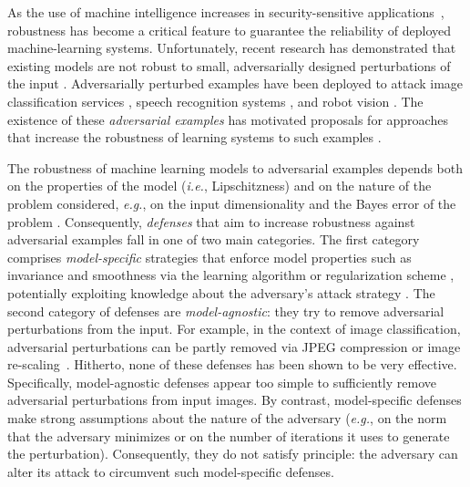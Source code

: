 As the use of machine intelligence increases in security-sensitive applications~\citep{bojarski2016end, amodei2015deep}, robustness has become a critical feature to guarantee the reliability of deployed machine-learning systems. Unfortunately, recent research has demonstrated that existing models are not robust to small, adversarially designed perturbations of the input \citep{biggio2013evasion, szegedy2013intriguing, goodfellow2015explaining, kurakin2016adversarial, cisse2017houdini}. Adversarially perturbed examples have been deployed to attack image classification services \citep{liu2016delving}, speech recognition systems \citep{cisse2017houdini}, and robot vision \citep{melis2017robot}. The existence of these \emph{adversarial examples} has motivated proposals for approaches that increase the robustness of learning systems to such examples \citep{papernot2016distillation, kurakin2016adversarial, cisse2017parseval}. 

The robustness of machine learning models to adversarial examples depends both on the properties of the model (\emph{i.e.}, Lipschitzness) and on the nature of the problem considered, \emph{e.g.}, on the input dimensionality and the Bayes error of the problem \citep{fawzi2015analysis, fawzi2016robustness}. Consequently, \emph{defenses} that aim to increase robustness against adversarial examples fall in one of two main categories. The first category comprises \emph{model-specific} strategies that enforce model properties such as invariance and smoothness via the learning algorithm or regularization scheme \citep{shaham2015understanding, kurakin2016adversarial, cisse2017parseval}, potentially exploiting knowledge about the adversary's attack strategy \citep{goodfellow2015explaining}.  %
The second category of defenses are \emph{model-agnostic}: they try to remove adversarial perturbations from the input. For example, in the context of image classification, adversarial perturbations can be partly removed via JPEG compression \citep{dziugaite2016study} or image re-scaling~\citep{lu2017no}. Hitherto, none of these defenses has been shown to be very effective. Specifically, model-agnostic defenses appear too simple to sufficiently remove adversarial perturbations from input images. By contrast, model-specific defenses make strong assumptions about the nature of the adversary (\emph{e.g.}, on the norm that the adversary minimizes or on the number of iterations it uses to generate the perturbation). Consequently, they do not satisfy \citet{kerckhoffs1883} principle: the adversary can alter its attack to circumvent such model-specific defenses. 

